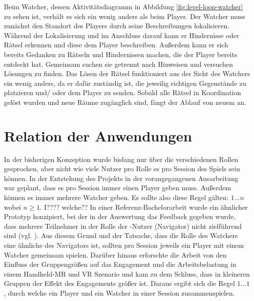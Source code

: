 Beim Watcher, dessen Aktivitätsdiagramm in Abbildung \ref{fig:level-loop-watcher} zu sehen ist, verhält es sich ein wenig anders als beim Player. Der Watcher muss zunächst den Standort des Players durch seine Beschreibungen lokalisieren. Während der Lokalisierung und im Anschluss darauf kann er Hindernisse oder Rätsel erkennen und diese dem Player beschreiben. Außerdem kann er sich bereits Gedanken zu Rätseln und Hindernissen machen, die der Player bereits entdeckt hat. Gemeinsam suchen sie getrennt nach Hinweisen und versuchen Lösungen zu finden. Das Lösen der Rätsel funktioniert aus der Sicht des Watchers ein wenig anders, da er dafür zuständig ist, die jeweilig richtigen Gegenstände zu platzieren und/ oder dem Player zu senden. Sobald alle Rätsel in Koordination gelöst wurden und neue Räume zugänglich sind, fängt der Ablauf von neuem an.

\section{Relation der Anwendungen}
In der bisherigen Konzeption wurde bislang nur über die verschiedenen Rollen gesprochen, aber nicht wie viele Nutzer pro Rolle es pro Session des Spiels sein können. In der Entstehung des Projekts in der vorangegangenen Ausarbeitung war geplant, dass es pro Session immer einen Player geben muss. Außerdem können es immer mehrere Watcher geben. Es sollte also diese Regel gälten: $1\ldots n$ \quad wobei $n \geq 1$. I???? welche?? In einer Referenz-Bachelorarbeit wurde ein ähnlicher Prototyp konzipiert, bei der in der Auswertung das Feedback gegeben wurde, dass mehrere Teilnehmer in der Rolle der -Nutzer (Navigator) nicht zielführend sind (vgl. \cite[S. 34]{lotz_konzeption_2021}). Aus diesem Grund und der Tatsache, dass die Rolle des Watchers eine ähnliche des Navigators ist, sollten pro Session jeweils ein Player mit einem Watcher gemeinsam spielen. Darüber hinaus erforschte die Arbeit von \cite[S. 197:22]{bautista_isaza_understanding_2024} den Einfluss der Gruppengrößen auf das Engagement und die Arbeitsbelastung in einem Handheld-\ac{MR} und \ac{VR} Szenario und kam zu dem Schluss, dass in kleineren Gruppen der Effekt des Engagements größer ist. Daraus ergibt sich die Regel $1\ldots1$, durch welche ein Player und ein Watcher in einer Session zusammenspielen.

